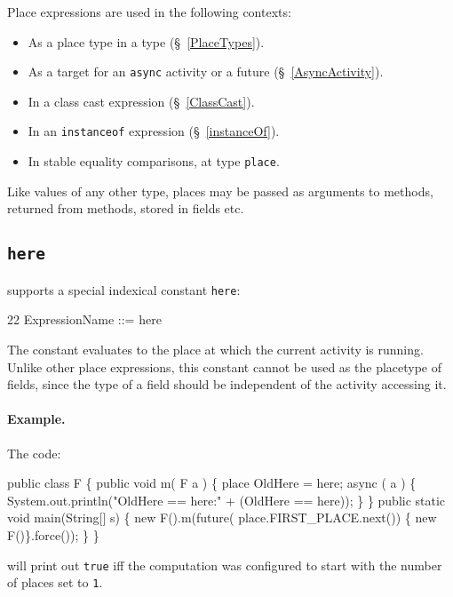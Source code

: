Place expressions are used in the following contexts: 
\begin{itemize}
\item As a  place type in a type (\S~\ref{PlaceTypes}).
\item As a target for an {\tt async} activity or a future
(\S~\ref{AsyncActivity}).
\item In a class cast expression  (\S~\ref{ClassCast}).
\item In an {\tt instanceof} expression (\S~\ref{instanceOf}).
\item In stable equality comparisons, at type {\tt place}.
\end{itemize}

Like values of any other type, places may be passed as arguments
to methods, returned from methods, stored in fields etc.

\subsection{{\tt here}}\label{Here}
\Xten{} supports a special indexical constant  {\tt here}:
\begin{x10}
22 ExpressionName ::= here
\end{x10}
The constant evaluates to the place at which the current activity is
running. Unlike other place expressions, this constant cannot be 
used as the placetype of fields, since the type of a field 
should be independent of the activity accessing it.

\paragraph{Example.}
The code:
\begin{x10}
public class F \{
   public void m( F a ) \{
     place OldHere = here;
     async ( a ) \{
      System.out.println("OldHere == here:" 
                         + (OldHere == here));
     \}
   \}
  public static void main(String[] s) \{
     new F().m(future( place.FIRST\_PLACE.next())
                \{ new F()\}.force());
  \}
\}  
\end{x10}
\noindent will print out {\tt true} iff the computation was configured
to start with the number of places set to {\tt 1}. 

